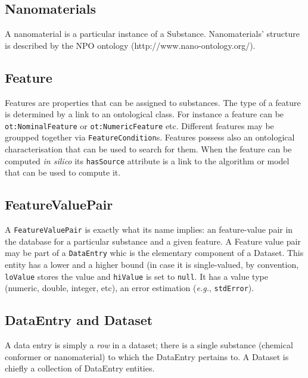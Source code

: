 \subsection{Nanomaterials}
A nanomaterial is a particular instance of a Substance. Nanomaterials'
structure is described by the NPO ontology (http://www.nano-ontology.org/).



\subsection{Feature}
Features are properties that can be assigned to substances. The type of
a feature is determined by a link to an ontological class. For instance
a feature can be \texttt{ot:NominalFeature} or \texttt{ot:NumericFeature}
etc. Different features may be groupped together via \texttt{FeatureCondition}s.
Features possess also an ontological characterisation that can be 
used to search for them. When the feature can be computed \textit{in silico}
its \texttt{hasSource} attribute
is a link to the algorithm or model that can be used to compute it.


\subsection{FeatureValuePair}
A \texttt{FeatureValuePair} is exactly what its name implies: 
an feature-value pair in the database
for a particular substance and a given feature.
A Feature value pair may be part of a \texttt{DataEntry} whic is 
the elementary component of a Dataset. This entity has a lower
and a higher bound (in case it is single-valued, by convention,
\texttt{loValue} stores the value and \texttt{hiValue} is set to 
\texttt{null}. It has a value type (numeric, double, integer, 
etc), an error estimation (\textit{e.g.}, \texttt{stdError}).


\subsection{DataEntry and Dataset}
A data entry is simply a \textit{row} in a dataset;
there is a single substance (chemical conformer or nanomaterial) to which
the DataEntry pertains to. A Dataset is chiefly a collection of 
DataEntry entities. 